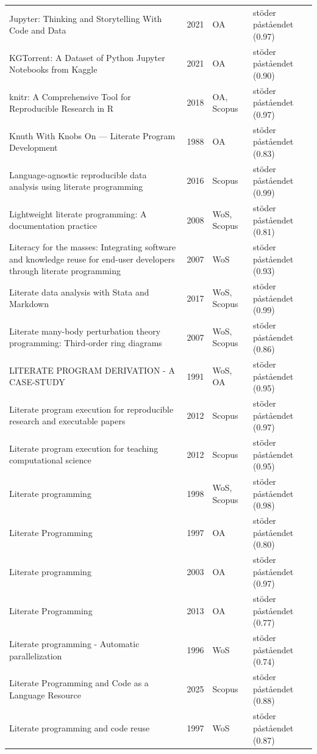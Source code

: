 \begin{longtable}{@{}%
  >{\raggedright\arraybackslash}p{}c%
  >{\raggedright\arraybackslash}p{}%
  >{\raggedright\arraybackslash}p{}@{}}
Jupyter: Thinking and Storytelling With Code and Data & 2021 & OA & stöder påståendet (0.97) \\
KGTorrent: A Dataset of Python Jupyter Notebooks from Kaggle & 2021 & OA & stöder påståendet (0.90) \\
knitr: A Comprehensive Tool for Reproducible Research in R & 2018 & OA, Scopus & stöder påståendet (0.97) \\
Knuth With Knobs On --- Literate Program Development & 1988 & OA & stöder påståendet (0.83) \\
Language-agnostic reproducible data analysis using literate programming & 2016 & Scopus & stöder påståendet (0.99) \\
Lightweight literate programming: A documentation practice & 2008 & WoS, Scopus & stöder påståendet (0.81) \\
Literacy for the masses: Integrating software and knowledge reuse for end-user developers through literate programming & 2007 & WoS & stöder påståendet (0.93) \\
Literate data analysis with Stata and Markdown & 2017 & WoS, Scopus & stöder påståendet (0.99) \\
Literate many-body perturbation theory programming: Third-order \textquotedbl{}ring\textquotedbl{} diagrams & 2007 & WoS, Scopus & stöder påståendet (0.86) \\
LITERATE PROGRAM DERIVATION - A CASE-STUDY & 1991 & WoS, OA & stöder påståendet (0.95) \\
Literate program execution for reproducible research and executable papers & 2012 & Scopus & stöder påståendet (0.97) \\
Literate program execution for teaching computational science & 2012 & Scopus & stöder påståendet (0.95) \\
Literate programming & 1998 & WoS, Scopus & stöder påståendet (0.98) \\
Literate Programming & 1997 & OA & stöder påståendet (0.80) \\
Literate programming & 2003 & OA & stöder påståendet (0.97) \\
Literate Programming & 2013 & OA & stöder påståendet (0.77) \\
Literate programming - Automatic parallelization & 1996 & WoS & stöder påståendet (0.74) \\
Literate Programming and Code as a Language Resource & 2025 & Scopus & stöder påståendet (0.88) \\
Literate programming and code reuse & 1997 & WoS & stöder påståendet (0.87) \\

\end{longtable}
